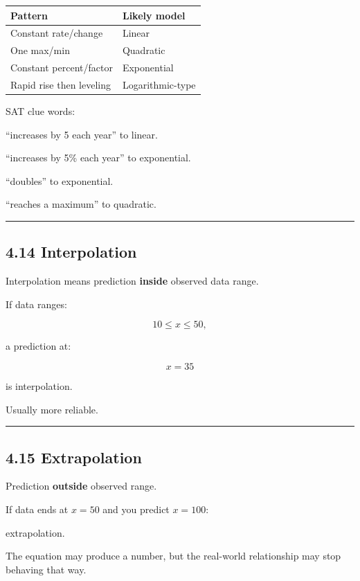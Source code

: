 \documentclass[
]{article}
\newcounter{none} %
\begin{document}
{\def\LTcaptype{none} %
\begin{longtable}[]{@{}ll@{}}
\toprule\noalign{}
Pattern & Likely model \\
\midrule\noalign{}
\endhead
\bottomrule\noalign{}
\endlastfoot
Constant rate/change & Linear \\
One max/min & Quadratic \\
Constant percent/factor & Exponential \\
Rapid rise then leveling & Logarithmic-type \\
\end{longtable}
}

SAT clue words:

``increases by 5 each year'' to linear.

``increases by 5\% each year'' to exponential.

``doubles'' to exponential.

``reaches a maximum'' to quadratic.

\begin{center}\rule{0.5\linewidth}{0.5pt}\end{center}

\subsection{4.14 Interpolation}\label{interpolation}

Interpolation means prediction \textbf{inside} observed data range.

If data ranges:

\[
10\le x\le50,
\]

a prediction at:

\[
x=35
\]

is interpolation.

Usually more reliable.

\begin{center}\rule{0.5\linewidth}{0.5pt}\end{center}

\subsection{4.15 Extrapolation}\label{extrapolation}

Prediction \textbf{outside} observed range.

If data ends at \(x=50\) and you predict \(x=100\):

extrapolation.

The equation may produce a number, but the real-world relationship may
stop behaving that way.
\end{document}
